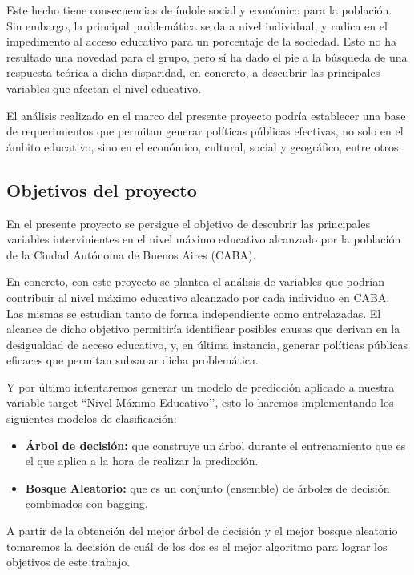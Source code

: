 \documentclass[a4paper]{article}
\begin{document}
        Este hecho tiene consecuencias de índole social y económico para la población. Sin embargo, la principal problemática se da a nivel individual, y radica en el impedimento al acceso educativo para un porcentaje de la sociedad. Esto no ha resultado una novedad para el grupo, pero sí ha dado el pie a la búsqueda de una respuesta teórica a dicha disparidad, en concreto, a descubrir las principales variables que afectan el nivel educativo.

        El análisis realizado en el marco del presente proyecto podría establecer una base de requerimientos que permitan generar políticas públicas efectivas, no solo en el ámbito educativo, sino en el económico, cultural, social y geográfico, entre otros.

    \subsection{Objetivos del proyecto}

        En el presente proyecto se persigue el objetivo de descubrir las principales variables intervinientes en el nivel máximo educativo alcanzado por la población de la Ciudad Autónoma de Buenos Aires (CABA).
        
        En concreto, con este proyecto se plantea el análisis de variables que podrían contribuir al nivel máximo educativo alcanzado por cada individuo en CABA. Las mismas se estudian tanto de forma independiente como entrelazadas. El alcance de dicho objetivo permitiría identificar posibles causas que derivan en la desigualdad de acceso educativo, y, en última instancia, generar políticas públicas eficaces que permitan subsanar dicha problemática. 

        Y por último intentaremos generar un modelo de predicción aplicado a nuestra variable target ``Nivel Máximo Educativo’’, esto lo haremos implementando los siguientes modelos de clasificación:
        \begin{itemize}
            \item \textbf{Árbol de decisión:} que construye un árbol durante el entrenamiento que es el que aplica a la hora de realizar la predicción.
            \item \textbf{Bosque Aleatorio:} que es un conjunto (ensemble) de árboles de decisión combinados con bagging.
        \end{itemize}
        A partir de la obtención del mejor árbol de decisión y el mejor bosque aleatorio tomaremos la decisión de cuál de los dos es el mejor algoritmo para lograr los objetivos de este trabajo.
\end{document}
